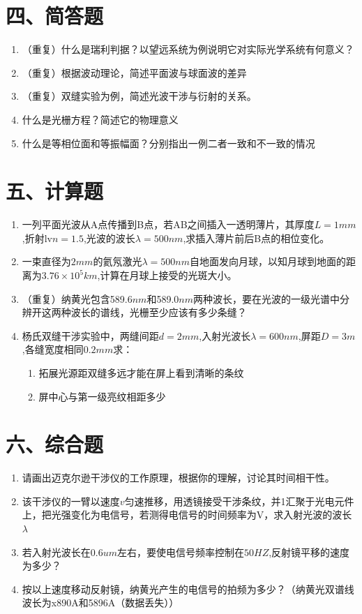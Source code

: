 \documentclass[12pt, a4paper]{article}
\theoremstyle{solution}
\begin{document}
\section*{四、简答题}
\begin{enumerate}
    \item （重复）什么是瑞利判据？以望远系统为例说明它对实际光学系统有何意义？
    \item （重复）根据波动理论，简述平面波与球面波的差异
    \item （重复）双缝实验为例，简述光波干涉与衍射的关系。
    \item 什么是光栅方程？简述它的物理意义
    \item 什么是等相位面和等振幅面？分别指出一例二者一致和不一致的情况
\end{enumerate}
\section*{五、计算题}
\begin{enumerate}
    \item 一列平面光波从A点传播到B点，若AB之间插入一透明薄片，其厚度$L=1mm$,折射lv$n=1.5$,光波的波长$\lambda=500nm$,求插入薄片前后B点的相位变化。
    \item 一束直径为$2mm$的氦氖激光$\lambda=500nm$自地面发向月球，以知月球到地面的距离为$3.76\times10^5km$,计算在月球上接受的光斑大小。
    \item （重复）纳黄光包含589.6$nm$和589.0$nm$两种波长，要在光波的一级光谱中分辨开这两种波长的谱线，光栅至少应该有多少条缝？
    \item 杨氏双缝干涉实验中，两缝间距$d=2mm$,入射光波长$\lambda=600nm$,屏距$D=3m$,各缝宽度相同$0.2mm$求：
        \begin{enumerate}
        \item 拓展光源距双缝多远才能在屏上看到清晰的条纹
        \item 屏中心与第一级亮纹相距多少
    \end{enumerate}
\end{enumerate}
\section*{六、综合题}
\begin{enumerate}    
    \item 请画出迈克尔逊干涉仪的工作原理，根据你的理解，讨论其时间相干性。
    \item 该干涉仪的一臂以速度$v$匀速推移，用透镜接受干涉条纹，并1汇聚于光电元件上，把光强变化为电信号，若测得电信号的时间频率为V，求入射光波的波长$\lambda$
    \item 若入射光波长在$0.6um$左右，要使电信号频率控制在$50HZ$,反射镜平移的速度为多少？
    \item 按以上速度移动反射镜，纳黄光产生的电信号的拍频为多少？（纳黄光双谱线波长为x890A和5896A（数据丢失））
\end{enumerate}
\end{document}
